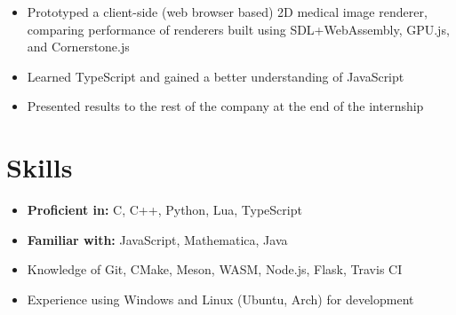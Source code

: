 \documentclass{article}
\begin{document}
		\begin{itemize}
			\item Prototyped a client-side (web browser based) 2D medical image renderer, comparing performance of renderers built using SDL+WebAssembly, GPU.js, and Cornerstone.js
			\item Learned TypeScript and gained a better understanding of JavaScript
			\item Presented results to the rest of the company at the end of the internship
		\end{itemize}

	\section*{Skills}
		\begin{itemize}
			\item \textbf{Proficient in:} C, C++, Python, Lua, TypeScript
			\item \textbf{Familiar with:} JavaScript, Mathematica, Java
			\item Knowledge of Git, CMake, Meson, WASM, Node.js, Flask, Travis CI
			\item Experience using Windows and Linux (Ubuntu, Arch) for development
		\end{itemize}
	
\end{document}
